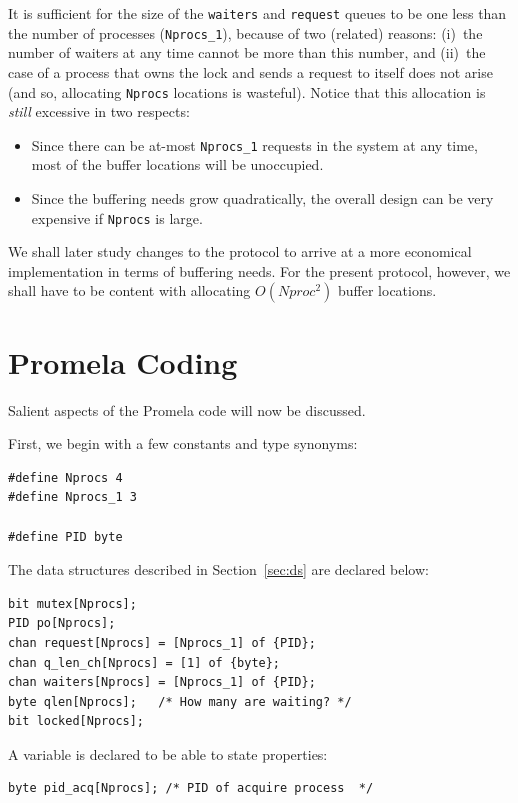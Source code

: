 \documentclass[11pt]{article}
\begin{document}
It is sufficient for the size of the {\tt waiters} and {\tt request} 
queues to be one less than the number of
processes ({\tt Nprocs\_1}), 
because of two (related) reasons: (i)~the number of waiters at
any time cannot be more than this number, and
(ii)~the case of a process that owns the lock and
sends a request to itself does not arise (and so, allocating 
{\tt Nprocs} locations is wasteful).
%
Notice that this allocation is {\em still} excessive in two respects:
%
\begin{itemize}
\item Since there can be at-most {\tt Nprocs\_1} requests in the
  system at any time, most of the buffer locations will be unoccupied.
\item Since the buffering needs grow quadratically,
  the overall design can be very expensive
  if {\tt Nprocs} is large.
\end{itemize}
%
We shall later study changes to the protocol to arrive at a more
economical implementation in terms of buffering needs.
%
For the present protocol, however, we shall have to be content with
allocating $O(Nproc^2)$ buffer locations.

\section{Promela Coding}

Salient aspects of the Promela code will now be discussed.

First, we begin with a few constants and type synonyms:
%
\begin{small}
\begin{verbatim}
#define Nprocs 4
#define Nprocs_1 3

#define PID byte
\end{verbatim}
\end{small}

The data structures described in Section~\ref{sec:ds} are
declared below:
%
\begin{small}
\begin{verbatim}
bit mutex[Nprocs];
PID po[Nprocs];
chan request[Nprocs] = [Nprocs_1] of {PID};
chan q_len_ch[Nprocs] = [1] of {byte};
chan waiters[Nprocs] = [Nprocs_1] of {PID};
byte qlen[Nprocs];   /* How many are waiting? */
bit locked[Nprocs];
\end{verbatim}
\end{small}

A variable is declared to be able to state properties:
\begin{small}
\begin{verbatim}
byte pid_acq[Nprocs]; /* PID of acquire process  */
\end{verbatim}
\end{small}
\end{document}
